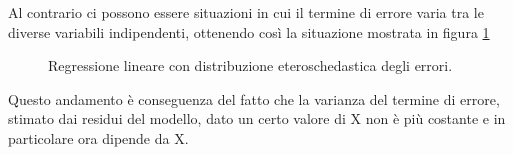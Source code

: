Al contrario ci possono essere situazioni in cui il termine di errore varia tra le diverse variabili indipendenti, ottenendo così la situazione mostrata in figura \ref{fig:regressione-eteroschedastica}
\begin{figure}[H]
	\centering
	\caption{Regressione lineare con distribuzione eteroschedastica degli errori.}
	\label{fig:regressione-eteroschedastica}
\end{figure} 
Questo andamento è conseguenza del fatto che la varianza del termine di errore, stimato dai residui del modello, dato un certo valore di X non è più costante e in particolare ora dipende da X.

